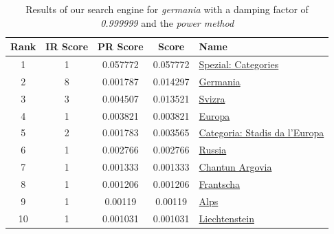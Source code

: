 \documentclass[pdftex,12pt,a4paper]{article}
\begin{document}
\begin{table}[H]
\centering
\begin{tabular}{ | c | c | c | c | l | }
\hline
Rank & IR Score & PR Score &  Score & Name \\ \hline
1 & 1 & 0.057772 & 0.057772 & \href{http://rm.wikipedia.org/wiki/Spezial:Categories}{Spezial: Categories} \\ \hline
2 & 8 & 0.001787 & 0.014297 & \href{http://rm.wikipedia.org/wiki/Germania}{Germania} \\ \hline
3 & 3 & 0.004507 & 0.013521 & \href{http://rm.wikipedia.org/wiki/Svizra}{Svizra} \\ \hline
4 & 1 & 0.003821 & 0.003821 & \href{http://rm.wikipedia.org/wiki/Europa}{Europa} \\ \hline
5 & 2 & 0.001783 & 0.003565 & \href{http://rm.wikipedia.org/wiki/Categoria:Stadis_da_l'Europa_dfba}{Categoria: Stadis da l'Europa} \\ \hline
6 & 1 & 0.002766 & 0.002766 & \href{http://rm.wikipedia.org/wiki/Russia}{Russia} \\ \hline
7 & 1 & 0.001333 & 0.001333 & \href{http://rm.wikipedia.org/wiki/Chantun_Argovia}{Chantun Argovia} \\ \hline
8 & 1 & 0.001206 & 0.001206 & \href{http://rm.wikipedia.org/wiki/Frantscha}{Frantscha} \\ \hline
9 & 1 & 0.00119 & 0.00119 & \href{http://rm.wikipedia.org/wiki/Alps}{Alps} \\ \hline
10 & 1 & 0.001031 & 0.001031 & \href{http://rm.wikipedia.org/wiki/Liechtenstein}{Liechtenstein} \\ \hline
\end{tabular}
\caption{Results of our search engine for \emph{germania} with a damping factor of \emph{0.999999} and the \emph{power method}}
\label{table_d=0.999999}
\end{table}
\end{document}
